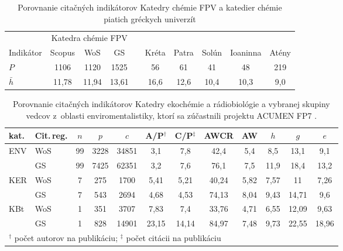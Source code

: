 \begin{table}
\centering\small
  \caption[Porovnanie KCh FPV a chemických katedier vybraných gréckych univerzít]
  {Porovnanie citačných indikátorov Katedry chémie FPV  a katedier chémie piatich gréckych univerzít \citep{Lazaridis2010}}
\begin{tabularx}{\textwidth}{Xccclccccc}
\toprule\noalign{\vspace{.5ex}}
           & \multicolumn{3}{c}{Katedra chémie FPV}& \phantom{M} & \multicolumn{5}{c}{\citet{Kazakis2015}} \\
Indikátor  & Scopus & WoS   & GS                 &  & Kréta & Patra & Solún & Ioaninna & Atény \\[0.3ex]
\midrule\noalign{\vspace{.5ex}}
 $P$         & 1106   & 1120  & 1525               & & 56    & 61    & 41    & 48       & 219   \\
 $\bar{h}$  & 11,78  & 11,94 & 13,61              & & 16,6  & 12,6  & 10,4  & 10,3     & 9,0   \\[0.5ex]
  \bottomrule
\end{tabularx}
  \label{tab:foo}
\end{table}

\begin{table}
\centering\small
  \caption[Porovnanie KEB, KBt a vybranej skupiny enviromentalistov]
  {Porovnanie citačných indikátorov Katedry ekochémie a rádiobiológie a vybranej skupiny vedcov z~oblasti enviromentalistiky, ktorí sa zúčastnili
  projektu ACUMEN FP7 \citep{Wildgaard2015}.}
\begin{tabularx}{\textwidth}{Xlcccccccccc}
  \toprule\noalign{\vspace{.3ex}}
 kat. &Cit.\,reg.   & $n$  & $p$    & $c$     & A/P$^\dagger$  & C/P$^\ddagger$ & AWCR & AW  & $h$    & $g$    & $e$    \\[0.3ex]
\midrule\noalign{\vspace{.5ex}}
 ENV  & WoS      & 99 & 3228 & 34851 & 3,1   & 7,8   & 42,4  & 5,4  & 8,5  & 13,1  & 9,1   \\
      & GS       & 99 & 7425 & 62351 & 3,2   & 7,6   & 76,1  & 7,5  & 11,9 & 18,4  & 13,2  \\[2ex]
 KER  & WoS      & 7  & 275  & 1700  & 5,41  & 5,21  & 40,24 & 5,82 & 7,57 & 11    & 7,26  \\
      & GS       & 7  & 543  & 2694  & 4,68  & 4,53  & 74,13 & 8,04 & 9,43 & 14,71 & 9,6   \\[2ex]
 KBt  & WoS      & 1  & 351  & 3707  & 7,83  & 7,4   & 33,76 & 4,71 & 6,55 & 12,09 & 9,63  \\
      & GS       & 1  & 828  & 14901 & 23,15 & 14,14 & 84,97 & 7,48 & 9,73 & 22,55 & 18,96 \\[0.5ex]
\bottomrule
    \multicolumn{12}{l}{\footnotesize $^\dagger$ počet autorov na publikáciu; $^\ddagger$ počet citácii na publikáciu} \\
\end{tabularx}
  \label{tab:foo2}
\end{table}

